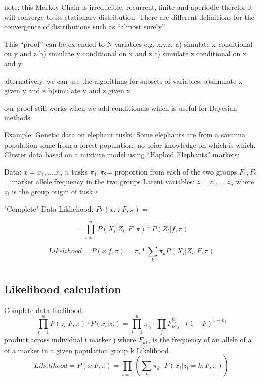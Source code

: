 \documentclass[12pt]{report}
\begin{document}
note: this Markov Chain is irreducible, recurrent, finite and aperiodic therefor it will converge to its stationary distribution. There are different definitions for the convergence of distributions such as “almost surely”. 

This “proof” can be extended to N variables e.g. x,y,z:
	a) simulate x conditional on y and z
	b) simulate y conditional on x and z
	c) simulate z conditional on x and y

alternatively, we can use the algorithms for subsets of variables: 
	a)simulate x given y and z
	b)simulate y and z given x
	
	
	our proof still works when we add conditionals which is useful for Bayesian methods.

Example: Genetic data on elephant tusks:
Some elephants are from a savanna population some from a forest population, no prior knowledge on which is which. Cluster data based on a mixture model using “Haploid Elephants” markers:

Data:  
$x=x_1,….x_n$ $n$ tusks
$\pi_1,\pi_2$=  proportion from each of the two groups
$F_1,F_2$ = marker allele frequency in the two groups
Latent variables: $z=z_1,….z_n$ where $z_i$  is the group origin of tusk $i$

"Complete" Data Likliehood: $Pr(x, z|F, \pi) =$

\begin{equation}
= \prod_{i=1}^n P(X_i| Z_i, F, \pi)*P(Z_i|f,\pi) 
\end{equation}



\begin{equation}
Likelihood = P(x|f,\pi) = \pi_i*\sum_k \pi_k P(X_i| Z_i, F, \pi) 
\end{equation}



\section{}


\subsection{Likelihood calculation}
Complete data likelihood.
\begin{equation}
\prod_{i=1}^n P(z_i|F,\pi) \cdot P(x_i|z_i)=
\prod_{i=1}^n \pi_{z_i} \cdot \prod_{j}F^{k_j}_{k1j } \cdot (1-F)^{1-k_j}
\end{equation}
product across individual i marker  j where
$F_{k1j}$ is the frequency of an allele of a of a marker in a given population group k 
Likelihood.
\begin{equation}
Likelihood=P(x|F,\pi)=\prod_{i=1} (\sum_k\pi_k \cdot P(x_i|z_i=k,F,\pi))
\end{equation}
\end{document}
